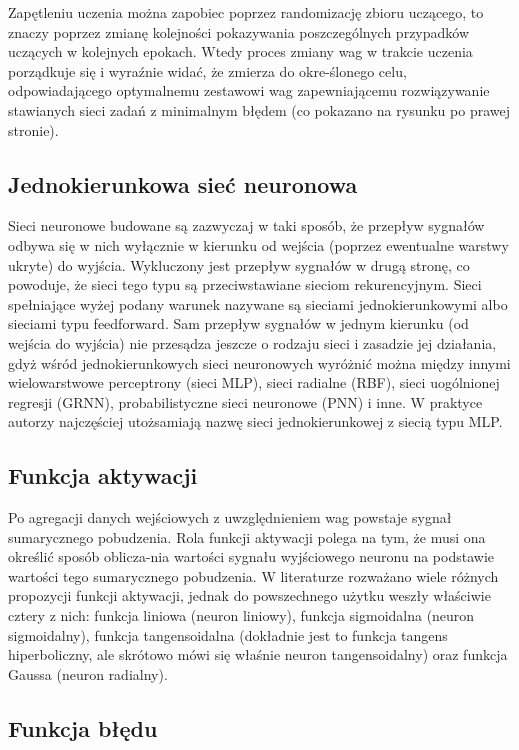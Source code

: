 \documentclass{article}
\begin{document}
Zapętleniu uczenia można zapobiec poprzez randomizację zbioru uczącego,
to znaczy poprzez zmianę kolejności pokazywania poszczególnych przypadków uczących
w kolejnych epokach. Wtedy proces zmiany wag w trakcie uczenia porządkuje się i wyraźnie widać,
że zmierza do okre-ślonego celu, odpowiadającego optymalnemu zestawowi wag zapewniającemu 
rozwiązywanie stawianych sieci zadań z minimalnym błędem (co pokazano na rysunku po prawej stronie).

\subsection{Jednokierunkowa sieć neuronowa}

Sieci neuronowe budowane są zazwyczaj w taki sposób, że przepływ sygnałów odbywa się
w nich wyłącznie w kierunku od wejścia (poprzez ewentualne warstwy ukryte) do wyjścia.
Wykluczony jest przepływ sygnałów w drugą stronę, co powoduje, że sieci tego typu są
przeciwstawiane sieciom rekurencyjnym. Sieci spełniające wyżej podany warunek nazywane
są sieciami jednokierunkowymi albo sieciami typu feedforward. Sam przepływ sygnałów w
jednym kierunku (od wejścia do wyjścia) nie przesądza jeszcze o rodzaju sieci i zasadzie 
jej działania, gdyż wśród jednokierunkowych sieci neuronowych wyróżnić można między
innymi wielowarstwowe perceptrony (sieci MLP), sieci radialne (RBF), sieci uogólnionej
regresji (GRNN), probabilistyczne sieci neuronowe (PNN) i inne. W praktyce autorzy
najczęściej utożsamiają nazwę sieci jednokierunkowej z siecią typu MLP.

\subsection{Funkcja aktywacji}

Po agregacji danych wejściowych z uwzględnieniem wag powstaje sygnał sumarycznego pobudzenia.
Rola funkcji aktywacji polega na tym, że musi ona określić sposób oblicza-nia wartości
sygnału wyjściowego neuronu na podstawie wartości tego sumarycznego pobudzenia.
W literaturze rozważano wiele różnych propozycji funkcji aktywacji,
jednak do powszechnego użytku weszły właściwie cztery z  nich: funkcja liniowa (neuron liniowy),
funkcja sigmoidalna (neuron sigmoidalny), funkcja tangensoidalna (dokładnie jest to funkcja
tangens hiperboliczny, ale skrótowo mówi się właśnie neuron tangensoidalny) oraz funkcja
Gaussa (neuron radialny).

\subsection{Funkcja błędu}
\end{document}
